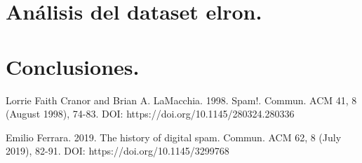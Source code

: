 \documentclass[12pt, letterpaper]{article}
\begin{document}
\section{Análisis del dataset elron.}


\section{Conclusiones.}

\begin{thebibliography}{1}

Lorrie Faith Cranor and Brian A. LaMacchia. 1998. Spam!. Commun. ACM 41, 8 (August 1998), 74-83. DOI: https://doi.org/10.1145/280324.280336

Emilio Ferrara. 2019. The history of digital spam. Commun. ACM 62, 8 (July 2019), 82-91. DOI: https://doi.org/10.1145/3299768

\end{thebibliography}
\end{document}
